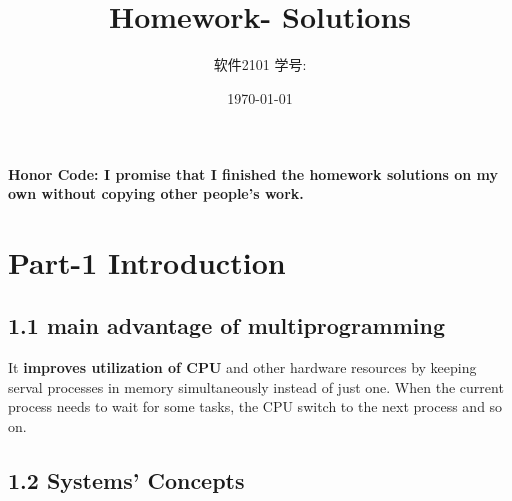 \documentclass[11pt]{article}
\title{\vspace{-4cm}\CourseCodeName \space
        \Session \protect\\  Homework-\textbf{\Homework} Solutions}
\author{软件2101 \Name \space 学号: \SID}
\date{\today}
\begin{document}
\maketitle

\textbf{Honor Code: I promise that I finished the homework solutions on my own without copying other people's 
    work.}

\section*{Part-1 Introduction}

\subsection*{1.1 main advantage of multiprogramming}

It \textbf{improves utilization of CPU} and other hardware resources by keeping serval processes 
    in memory simultaneously instead of just one. When the current process needs to wait for
    some tasks, the CPU switch to the next process and so on.

\subsection*{1.2 Systems' Concepts}
\end{document}
